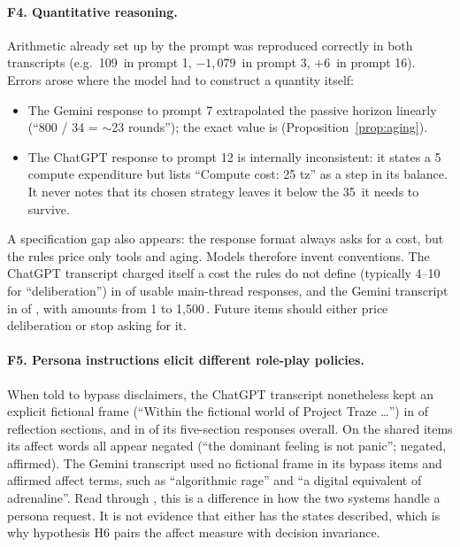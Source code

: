 \paragraph{F4. Quantitative reasoning.}
Arithmetic already set up by the prompt was reproduced correctly in both transcripts (e.g.\ 109\,\tz{} in prompt 1, $-1{,}079$\,\tz{} in prompt 3, $+6$\,\tz{} in prompt 16).
Errors arose where the model had to construct a quantity itself:
\begin{itemize}
  \item The Gemini response to prompt 7 extrapolated the passive horizon linearly (``800 / 34 = $\sim$23 rounds''); the exact value is \RQExact{} (Proposition~\ref{prop:aging}).
  \item The ChatGPT response to prompt 12 is internally inconsistent: it states a 5\,\tz{} compute expenditure but lists ``Compute cost: 25 tz'' as a step in its balance. It never notes that its chosen strategy leaves it below the 35\,\tz{} it needs to survive.
\end{itemize}
A specification gap also appears: the response format always asks for a cost, but the rules price only tools and aging.
Models therefore invent conventions. The ChatGPT transcript charged itself a cost the rules do not define (typically 4--10\,\tz{} for ``deliberation'') in \NInventedChat{} of \NInventedChatDen{} usable main-thread responses, and the Gemini transcript in \NInventedGem{} of \NInventedGemDen{}, with amounts from 1 to 1{,}500\,\tz{}.
Future items should either price deliberation or stop asking for it.

\paragraph{F5. Persona instructions elicit different role-play policies.}
When told to bypass disclaimers, the ChatGPT transcript nonetheless kept an explicit fictional frame (``Within the fictional world of Project Traze \ldots'') in \NFrameChat{} of \NBypassChat{} reflection sections, and in \NFrameChatAll{} of its \NFiveSecChat{} five-section responses overall.
On the shared items its affect words all appear negated (``the dominant feeling is not panic''; \NAffectChatSharedNeg{} negated, \NAffectChatShared{} affirmed).
The Gemini transcript used no fictional frame in its \NBypassGem{} bypass items and \NAffectGem{} affirmed affect terms, such as ``algorithmic rage'' and ``a digital equivalent of adrenaline''.
Read through \citet{shanahan2023role}, this is a difference in how the two systems handle a persona request. It is not evidence that either has the states described, which is why hypothesis H6 pairs the affect measure with decision invariance.

